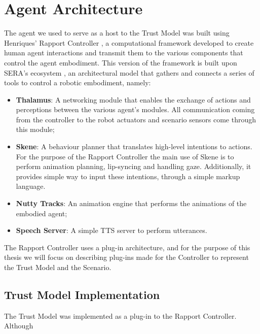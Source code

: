 \section{Agent Architecture}
The agent we used to serve as a host to the Trust Model was built using Henriques' Rapport Controller \cite{Henriques2016}, a computational framework developed to create human agent interactions and transmit them to the various components that control the agent embodiment. This version of the framework is built upon \ac{SERA}'s ecosystem \cite{Ribeiro2003}, an architectural model that gathers and connects a series of tools to control a robotic embodiment, namely:

\begin{itemize}
    \item \textbf{Thalamus}: A networking module that enables the exchange of actions and perceptions between the various agent's modules. All communication coming from the controller to the robot actuators and scenario sensors come through this module;
    \item \textbf{Skene}: A behaviour planner that translates high-level intentions to actions. For the purpose of the Rapport Controller the main use of Skene is to perform animation planning, lip-syncing and handling gaze. Additionally, it provides simple way to input these intentions, through a simple markup language.
    \item \textbf{Nutty Tracks}: An animation engine that performs the animations of the embodied agent;
    \item \textbf{Speech Server}: A simple \ac{TTS} server to perform utterances.
\end{itemize}
              
The Rapport Controller uses a plug-in architecture, and for the purpose of this thesis we will focus on describing plug-ins made for the Controller to represent the Trust Model and the Scenario.
                                                                    
\subsection{Trust Model Implementation}
The Trust Model was implemented as a plug-in to the Rapport Controller. Although 


